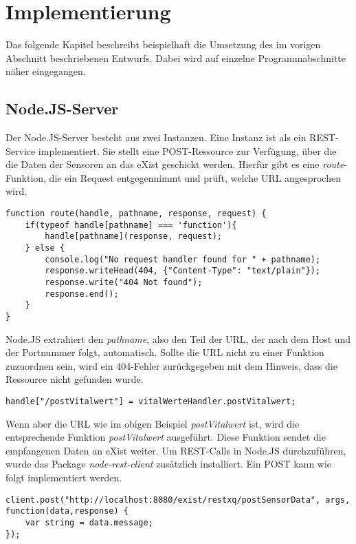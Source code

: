 \section{Implementierung}
\label{sec:Implementierung}
Das folgende Kapitel beschreibt beispielhaft die Umsetzung des im vorigen Abschnitt beschriebenen Entwurfs. Dabei wird auf einzelne Programmabschnitte näher eingegangen.

\subsection{Node.JS-Server}
\label{subsec:NodeJSServer}
Der Node.JS-Server besteht aus zwei Instanzen. Eine Instanz ist als ein REST-Service implementiert. Sie stellt eine POST-Ressource zur Verfügung, über die die Daten der Sensoren an das eXist geschickt werden. Hierfür gibt es eine \textit{route}-Funktion, die ein Request entgegennimmt und prüft, welche URL angesprochen wird. 

\begin{lstlisting}
function route(handle, pathname, response, request) {
    if(typeof handle[pathname] === 'function'){
        handle[pathname](response, request);
    } else {
        console.log("No request handler found for " + pathname);
        response.writeHead(404, {"Content-Type": "text/plain"});
        response.write("404 Not found");
        response.end();
    }
}
\end{lstlisting}

Node.JS extrahiert den \textit{pathname}, also den Teil der URL, der nach dem Host und der Portnummer folgt, automatisch. Sollte die URL nicht zu einer Funktion zuzuordnen sein, wird ein 404-Fehler zurückgegeben mit dem Hinweis, dass die Ressource nicht gefunden wurde.

\begin{lstlisting}
handle["/postVitalwert"] = vitalWerteHandler.postVitalwert;
\end{lstlisting}

Wenn aber die URL wie im obigen Beispiel \textit{postVitalwert} ist, wird die entsprechende Funktion \textit{postVitalwert} ausgeführt. Diese Funktion sendet die empfangenen Daten an eXist weiter. Um REST-Calls in Node.JS durchzuführen, wurde das Package \textit{node-rest-client} zusätzlich installiert. Ein POST kann wie folgt implementiert werden.

\begin{lstlisting}
client.post("http://localhost:8080/exist/restxq/postSensorData", args, function(data,response) {
    var string = data.message;
});
\end{lstlisting}

